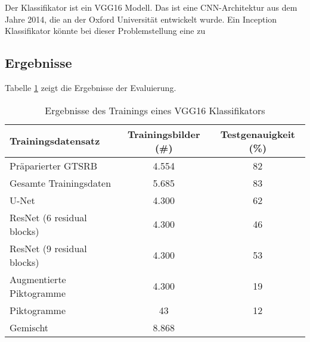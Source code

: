 Der Klassifikator ist ein VGG16 Modell. Das ist eine \ac{CNN}-Architektur aus dem Jahre 2014, die an der Oxford Universität entwickelt wurde. Ein Inception Klassifikator könnte bei dieser Problemstellung eine zu 


\subsection{Ergebnisse}

Tabelle \ref{tab:results} zeigt die Ergebnisse der Evaluierung.

\begin{table}[h]
	\centering
	\begin{tabular}{|l|c|c|}
	\hline
	Trainingsdatensatz & Trainingsbilder (\#) & Testgenauigkeit (\%) \\ \hline \hline
	Präparierter GTSRB & 4.554 & 82 \\ \hline
   Gesamte Trainingsdaten & 5.685 & 83 \\ \hline \hline
   U-Net & 4.300 & 62 \\ \hline
	ResNet (6 residual blocks) & 4.300 & 46 \\ \hline
   ResNet (9 residual blocks) & 4.300 & 53 \\ \hline \hline
	Augmentierte Piktogramme & 4.300 & 19 \\ \hline
   Piktogramme & 43 & 12 \\ \hline \hline
	Gemischt & 8.868 & \\ \hline
	\end{tabular}
	\caption{Ergebnisse des Trainings eines VGG16 Klassifikators}
	\label{tab:results}
\end{table}

